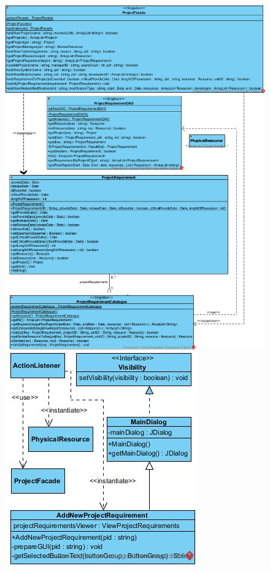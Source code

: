 \begin{landscape}
\begin{figure}[H]
	\includegraphics[scale=0.5]{img/sequence-design/AddRequirementToProject_PHYSICALC}
	\includegraphics[scale=0.5]{img/sequence-design/AddRequirementToProject_PHYSICALUI}

\end{figure}
\end{landscape}
